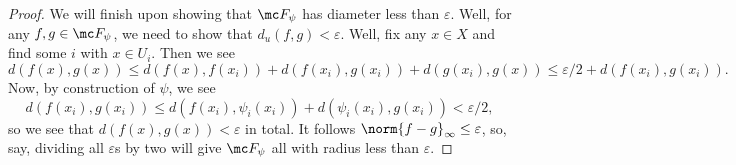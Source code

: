 \documentclass[../notes.tex]{subfiles}
\begin{document}
\begin{proof}
	
	We will finish upon showing that $\mc F_\psi$ has diameter less than $\varepsilon$. Well, for any $f,g\in\mc F_\psi$, we need to show that $d_u(f,g)<\varepsilon$. Well, fix any $x\in X$ and find some $i$ with $x\in U_i$. Then we see
	\[d(f(x),g(x))\le d(f(x),f(x_i))+d(f(x_i),g(x_i))+d(g(x_i),g(x))\le\varepsilon/2+d(f(x_i),g(x_i)).\]
	Now, by construction of $\psi$, we see
	\[d(f(x_i),g(x_i))\le d(f(x_i),\psi_i(x_i))+d(\psi_i(x_i),g(x_i))<\varepsilon/2,\]
	so we see that $d(f(x),g(x))<\varepsilon$ in total. It follows $\norm{f-g}_\infty\le\varepsilon$, so, say, dividing all $\varepsilon$s by two will give $\mc F_\psi$ all with radius less than $\varepsilon$.
\end{proof}
\end{document}
